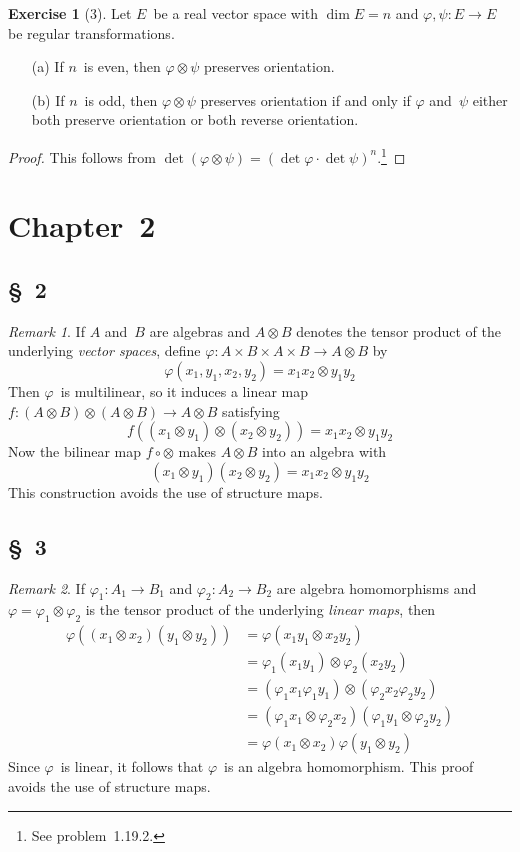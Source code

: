 \documentclass[letterpaper,12pt]{article}
\newcommand{\after}{\circ}
\newcommand{\mult}{\cdot}
\newcommand{\tprod}{\otimes}
\theoremstyle{definition}
\newtheorem*{exer}{Exercise}
\theoremstyle{remark}
\newtheorem*{rmk}{Remark}
\begin{document}
\begin{exer}[3]
Let \(E\)~be a real vector space with \(\dim E=n\) and \(\varphi,\psi:E\to E\) be regular transformations.
\begin{enumerate}
\item[(a)] If \(n\)~is even, then \(\varphi\tprod\psi\) preserves orientation.
\item[(b)] If \(n\)~is odd, then \(\varphi\tprod\psi\) preserves orientation if and only if \(\varphi\) and~\(\psi\) either both preserve orientation or both reverse orientation.
\end{enumerate}
\end{exer}
\begin{proof}
This follows from \(\det(\varphi\tprod\psi)=(\det\varphi\mult\det\psi)^n\).\footnote{See problem~1.19.2.}
\end{proof}

\section*{Chapter~2}
\subsection*{\S~2}
\begin{rmk}
If \(A\) and~\(B\) are algebras and \(A\tprod B\) denotes the tensor product of the underlying \emph{vector spaces}, define \(\varphi:A\times B\times A\times B\to A\tprod B\) by
\[\varphi(x_1,y_1,x_2,y_2)=x_1x_2\tprod y_1y_2\]
Then \(\varphi\)~is multilinear, so it induces a linear map \(f:(A\tprod B)\tprod(A\tprod B)\to A\tprod B\) satisfying
\[f((x_1\tprod y_1)\tprod(x_2\tprod y_2))=x_1x_2\tprod y_1y_2\]
Now the bilinear map \(f\after\tprod\) makes \(A\tprod B\) into an algebra with
\[(x_1\tprod y_1)(x_2\tprod y_2)=x_1x_2\tprod y_1y_2\]
This construction avoids the use of structure maps.
\end{rmk}

\subsection*{\S~3}
\begin{rmk}
If \(\varphi_1:A_1\to B_1\) and \(\varphi_2:A_2\to B_2\) are algebra homomorphisms and \(\varphi=\varphi_1\tprod\varphi_2\) is the tensor product of the underlying \emph{linear maps}, then
\begin{align*}
\varphi((x_1\tprod x_2)(y_1\tprod y_2))&=\varphi(x_1y_1\tprod x_2y_2)\\
	&=\varphi_1(x_1y_1)\tprod\varphi_2(x_2y_2)\\
	&=(\varphi_1x_1\varphi_1y_1)\tprod(\varphi_2x_2\varphi_2y_2)\\
	&=(\varphi_1x_1\tprod\varphi_2 x_2)(\varphi_1y_1\tprod\varphi_2 y_2)\\
	&=\varphi(x_1\tprod x_2)\varphi(y_1\tprod y_2)
\end{align*}
Since \(\varphi\)~is linear, it follows that \(\varphi\)~is an algebra homomorphism. This proof avoids the use of structure maps.
\end{rmk}
\end{document}
